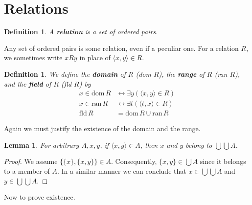 \documentclass{report}
\newtheorem{lemma}[theo]{Lemma}
\newtheorem{definition}[theo]{Definition}
\begin{document}
\section{Relations}
\begin{definition}
A \textbf{relation} is a set of ordered pairs.
\end{definition}
\noindent Any set of ordered pairs is some relation, even if a peculiar one. For a relation $R$, we sometimes write $xRy$ in place of $\langle x,y\rangle\in R$.
\begin{definition}
We define the \textbf{domain} of $R$ (dom $R$), the \textbf{range} of $R$ (ran $R$), and the \textbf{field} of $R$ (fld $R$) by
\begin{align*}
x\in\text{dom}\,R&\leftrightarrow\exists y(\langle x,y\rangle\in R)\\
x\in\text{ran}\,R&\leftrightarrow\exists t(\langle t,x\rangle\in R)\\
\text{fld}\,R&=\text{dom}\,R\cup\text{ran}\,R
\end{align*}
\end{definition}
\noindent Again we must justify the existence of the domain and the range. 
\begin{lemma}
For arbitrary $A,x,y$, if $\langle x,y\rangle\in A$, then $x$ and $y$ belong to $\bigcup\bigcup A$.
\end{lemma}
\begin{proof}
We assume $\{\{x\},\{x,y\}\}\in A$. Consequently, $\{x,y\}\in\bigcup A$ since it belongs to a member of $A$. In a similar manner we can conclude that $x\in\bigcup\bigcup A$ and
$y\in\bigcup\bigcup A$.
\end{proof}
\noindent Now to prove existence. 
\end{document}
